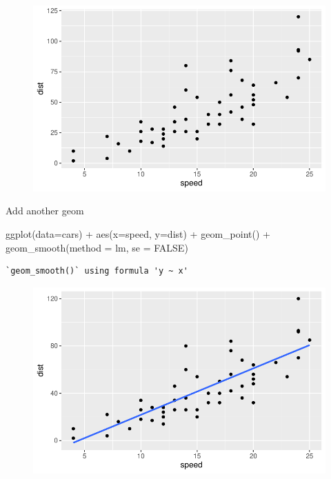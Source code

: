 \documentclass[
  letterpaper,
  DIV=11,
  numbers=noendperiod]{scrartcl}
\newenvironment{Shaded}{\begin{snugshade}}{\end{snugshade}}
\newcommand{\AttributeTok}[1]{\textcolor[rgb]{0.40,0.45,0.13}{#1}}
\newcommand{\ConstantTok}[1]{\textcolor[rgb]{0.56,0.35,0.01}{#1}}
\newcommand{\FunctionTok}[1]{\textcolor[rgb]{0.28,0.35,0.67}{#1}}
\newcommand{\NormalTok}[1]{\textcolor[rgb]{0.00,0.23,0.31}{#1}}
\newcommand{\SpecialCharTok}[1]{\textcolor[rgb]{0.37,0.37,0.37}{#1}}
\begin{document}
\begin{figure}[H]

{\centering \includegraphics{class5_lab_bggn_files/figure-pdf/unnamed-chunk-4-1.pdf}

}

\end{figure}

Add another geom

\begin{Shaded}
\begin{Highlighting}[]
\FunctionTok{ggplot}\NormalTok{(}\AttributeTok{data=}\NormalTok{cars) }\SpecialCharTok{+} 
  \FunctionTok{aes}\NormalTok{(}\AttributeTok{x=}\NormalTok{speed, }\AttributeTok{y=}\NormalTok{dist) }\SpecialCharTok{+} 
  \FunctionTok{geom\_point}\NormalTok{() }\SpecialCharTok{+} 
  \FunctionTok{geom\_smooth}\NormalTok{(}\AttributeTok{method =}\NormalTok{ lm, }\AttributeTok{se =} \ConstantTok{FALSE}\NormalTok{)}
\end{Highlighting}
\end{Shaded}

\begin{verbatim}
`geom_smooth()` using formula 'y ~ x'
\end{verbatim}

\begin{figure}[H]

{\centering \includegraphics{class5_lab_bggn_files/figure-pdf/unnamed-chunk-5-1.pdf}

}

\end{figure}
\end{document}
